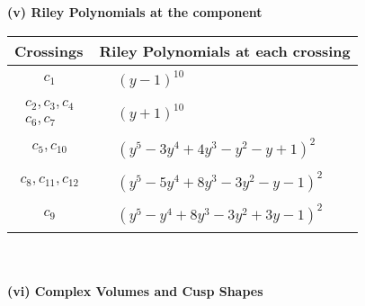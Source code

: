 \documentclass[1p]{elsarticle_modified}
\theoremstyle{definition}
\begin{document}
\newpage\renewcommand{\arraystretch}{1}
\flushleft \textbf{(v) Riley Polynomials at the component}\newline \\
\begin{tabular}{m{50pt}|m{274pt}}
Crossings & \hspace{64pt}Riley Polynomials at each crossing \\
\hline $$\begin{aligned}c_{1}\end{aligned}$$&$\begin{aligned}
&(y-1)^{10}
\end{aligned}$\\
\hline $$\begin{aligned}c_{2},c_{3},c_{4}\\c_{6},c_{7}\end{aligned}$$&$\begin{aligned}
&(y+1)^{10}
\end{aligned}$\\
\hline $$\begin{aligned}c_{5},c_{10}\end{aligned}$$&$\begin{aligned}
&(y^5-3 y^4+4 y^3- y^2- y+1)^2
\end{aligned}$\\
\hline $$\begin{aligned}c_{8},c_{11},c_{12}\end{aligned}$$&$\begin{aligned}
&(y^5-5 y^4+8 y^3-3 y^2- y-1)^2
\end{aligned}$\\
\hline $$\begin{aligned}c_{9}\end{aligned}$$&$\begin{aligned}
&(y^5- y^4+8 y^3-3 y^2+3 y-1)^2
\end{aligned}$\\
\hline
\end{tabular}\\~\\
\newpage\flushleft \textbf{(vi) Complex Volumes and Cusp Shapes}
\end{document}
